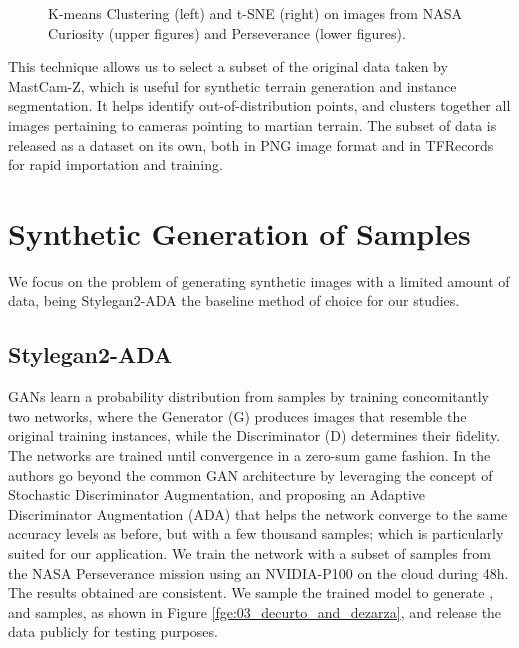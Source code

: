 \documentclass[lettersize,journal]{IEEEtran}
\begin{document}
\begin{figure}[ht]
\centering
{}
\caption{K-means Clustering (left) and t-SNE (right) on images from NASA Curiosity (upper figures) and Perseverance (lower figures).}
\label{fge:01_decurto_and_dezarza}
\end{figure}

This technique allows us to select a subset of the original data taken by MastCam-Z, which is useful for synthetic terrain generation and instance segmentation. It helps identify out-of-distribution points, and clusters together all images pertaining to cameras pointing to martian terrain. The subset of data is released as a dataset 
on its own, both in PNG image format and in TFRecords for rapid importation and training.

\section{Synthetic Generation of Samples}
\label{sn:syntheticsamples}

We focus on the problem of generating synthetic images with a limited amount of data, being Stylegan2-ADA \cite{Karras2020} the baseline method of choice for our studies.

\subsection{Stylegan2-ADA}
GANs learn a probability distribution from samples by training concomitantly two networks, where the Generator (G) produces images that resemble the original training instances, while the Discriminator (D) determines their fidelity. The networks are trained until convergence in a zero-sum game fashion. In \cite{Karras2020} the authors go beyond the common GAN architecture by leveraging the concept of Stochastic Discriminator Augmentation, and proposing an Adaptive Discriminator Augmentation (ADA) that helps the network converge to the same accuracy levels as before, but with a few thousand samples; which is particularly suited for our application. We train the network with a subset of  samples from the NASA Perseverance mission using an NVIDIA-P100 on the cloud during 48h. The results obtained are consistent. We sample the trained model to generate ,  and  samples, as shown in Figure \ref{fge:03_decurto_and_dezarza}, and release the data publicly for testing purposes.
\end{document}
